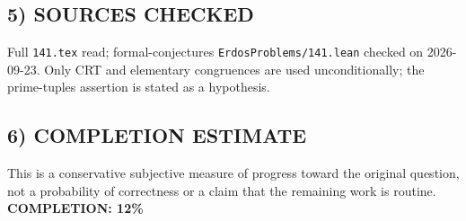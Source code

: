\subsection{5) SOURCES CHECKED}
Full \texttt{141.tex} read; formal-conjectures \texttt{ErdosProblems/141.lean} checked on 2026-09-23. Only CRT and elementary congruences are used unconditionally; the prime-tuples assertion is stated as a hypothesis.
\subsection{6) COMPLETION ESTIMATE}
This is a conservative subjective measure of progress toward the original question, not a probability of correctness or a claim that the remaining work is routine.
\textbf{COMPLETION: 12\%}

